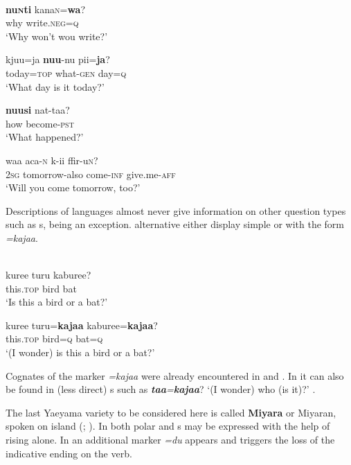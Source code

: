 \ea%
    \label{ex:japa:46}
    \\
    \ea
    \gll \textbf{{nu}}\textbf{\textsc{n}}\textbf{{ti}} kana\textsc{n=}\textbf{{wa}}?\\
    why  write.\textsc{neg=q}\\
    \glt ‘Why won’t wou write?’
    
    \ex
    \gll kjuu=ja \textbf{{nuu}}-nu  pii=\textbf{{ja}}?\\
    today=\textsc{top}  what-\textsc{gen}  day=\textsc{q}\\
    \glt ‘What day is it today?’
    
    \ex
    \gll \textbf{{nuusi}} nat-taa?\\
    how  become-\textsc{pst}\\
    \glt ‘What happened?’
    
    \ex
    \gll waa  aca-\textsc{n} k-ii    ffir-u\textsc{n}?\\
    2\textsc{sg}  tomorrow-also    come-\textsc{inf}  give.me-\textsc{aff}\\
    \glt ‘Will you come tomorrow, too?’ \citep[396]{Lawrence2012}\z\z

Descriptions of  languages almost never give information on other question types such as s, \citet[397]{Lawrence2012} being an exception.  alternative  either display simple  or  with the form \textit{=kajaa}.

\ea%
    \label{ex:japa:47}
    \\
    \ea
    \gll kuree    turu  kaburee?\\
    this.\textsc{top}  bird  bat\\
    \glt ‘Is this a bird or a bat?’
    
    \ex
    \gll kuree    turu=\textbf{{kajaa}} kaburee=\textbf{{kajaa}}?\\
    this.\textsc{top}  bird=\textsc{q}    bat=\textsc{q}\\
    \glt ‘(I wonder) is this a bird or a bat?’ \citep[397]{Lawrence2012}
    \z
    \z

\noindent Cognates of the marker \textit{=kajaa} were already encountered in  and . In  it can also be found in (less direct) s such as \textbf{\textit{taa}}\textit{=}\textbf{\textit{kajaa}}? ‘(I wonder) who (is it)?’ \citep[396]{Lawrence2012}.

The last Yaeyama variety to be considered here is called \textbf{Miyara} or Miyaran, spoken on  island (\citealt{Izuyama2003}; \citealt{Davis2015}). In  both polar and s may be expressed with the help of rising  alone. In   an additional  marker \textit{=du} appears and triggers the loss of the indicative ending on the verb.

